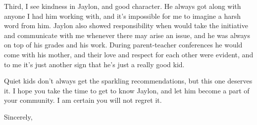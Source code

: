 \documentclass[11pt, letterpaper]{letter} %
\begin{document}
\begin{letter}
Third, I see kindness in Jaylon, and good character. He always got along with anyone I had him working with, and it's impossible for me to imagine a harsh word from him. Jaylon also showed responsibility when would take the initiative and communicate with me whenever there may arise an issue, and he was always on top of his grades and his work. During parent-teacher conferences he would come with his mother, and their love and respect for each other were evident, and to me it's just another sign that he's just a really good kid.

Quiet kids don't always get the sparkling recommendations, but this one deserves it. I hope you take the time to get to know Jaylon, and let him become a part of your community. I am certain you will not regret it.

\closing{Sincerely,}




\end{letter}
\end{document}
